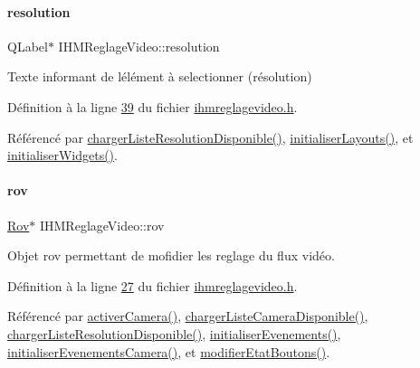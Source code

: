 \mbox{\label{class_i_h_m_reglage_video_a7fd79309e9501b8cb340ae61b96c0366}} 
\paragraph{\texorpdfstring{resolution}{resolution}}
{\footnotesize\ttfamily Q\+Label$\ast$ I\+H\+M\+Reglage\+Video\+::resolution\hspace{0.3cm}{\ttfamily [private]}}



Texte informant de l\textquotesingle{}élément à selectionner (résolution) 



Définition à la ligne \hyperlink{ihmreglagevideo_8h_source_l00039}{39} du fichier \hyperlink{ihmreglagevideo_8h_source}{ihmreglagevideo.\+h}.



Référencé par \hyperlink{ihmreglagevideo_8cpp_source_l00179}{charger\+Liste\+Resolution\+Disponible()}, \hyperlink{ihmreglagevideo_8cpp_source_l00061}{initialiser\+Layouts()}, et \hyperlink{ihmreglagevideo_8cpp_source_l00023}{initialiser\+Widgets()}.

\mbox{\label{class_i_h_m_reglage_video_a755736fe361e651453de6bc21725a626}} 
\paragraph{\texorpdfstring{rov}{rov}}
{\footnotesize\ttfamily \hyperlink{class_rov}{Rov}$\ast$ I\+H\+M\+Reglage\+Video\+::rov\hspace{0.3cm}{\ttfamily [private]}}



Objet rov permettant de mofidier les reglage du flux vidéo. 



Définition à la ligne \hyperlink{ihmreglagevideo_8h_source_l00027}{27} du fichier \hyperlink{ihmreglagevideo_8h_source}{ihmreglagevideo.\+h}.



Référencé par \hyperlink{ihmreglagevideo_8cpp_source_l00203}{activer\+Camera()}, \hyperlink{ihmreglagevideo_8cpp_source_l00132}{charger\+Liste\+Camera\+Disponible()}, \hyperlink{ihmreglagevideo_8cpp_source_l00179}{charger\+Liste\+Resolution\+Disponible()}, \hyperlink{ihmreglagevideo_8cpp_source_l00105}{initialiser\+Evenements()}, \hyperlink{ihmreglagevideo_8cpp_source_l00117}{initialiser\+Evenements\+Camera()}, et \hyperlink{ihmreglagevideo_8cpp_source_l00212}{modifier\+Etat\+Boutons()}.

